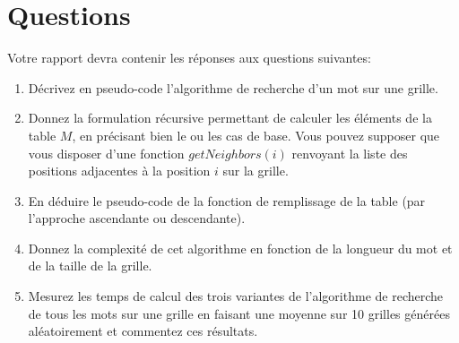 \documentclass[a4paper,10pt]{article}
\begin{document}
\section{Questions}

Votre rapport devra contenir les réponses aux questions suivantes:
\begin{enumerate}
\item Décrivez en pseudo-code l'algorithme de recherche d'un mot sur
  une grille.
\item Donnez la formulation récursive permettant de calculer les
  éléments de la table $M$, en précisant bien le ou les cas de
  base. Vous pouvez supposer que vous disposer d'une fonction
  $getNeighbors(i)$ renvoyant la liste des positions adjacentes à la
  position $i$ sur la grille.
\item En déduire le pseudo-code de la fonction de remplissage de la
  table (par l'approche ascendante ou descendante).
\item Donnez la complexité de cet algorithme en fonction de la
  longueur du mot et de la taille de la grille.
\item Mesurez les temps de calcul des trois variantes de l'algorithme
  de recherche de tous les mots sur une grille en faisant une moyenne
  sur 10 grilles générées aléatoirement et commentez ces résultats.
\end{enumerate}
\end{document}
